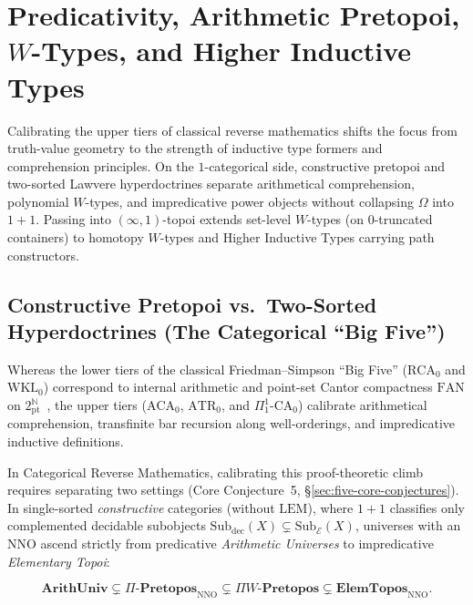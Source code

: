 \documentclass[10pt,twoside,openright]{book}
\theoremstyle{crmplain}
\theoremstyle{crmdef}
\theoremstyle{crmremark}
\begin{document}
\section{Predicativity, Arithmetic Pretopoi, $W$-Types, and Higher Inductive Types}\label{sec:predicativity-wtypes}

Calibrating the upper tiers of classical reverse mathematics shifts the focus from truth-value geometry to the strength of inductive type formers and comprehension principles. On the $1$-categorical side, constructive pretopoi and two-sorted Lawvere hyperdoctrines separate arithmetical comprehension, polynomial $W$-types, and impredicative power objects without collapsing $\Omega$ into $1 + 1$. Passing into $(\infty, 1)$-topoi extends set-level $W$-types (on $0$-truncated containers) to homotopy $W$-types and Higher Inductive Types carrying path constructors.

\subsection{Constructive Pretopoi vs.\ Two-Sorted Hyperdoctrines (The Categorical ``Big Five'')}

Whereas the lower tiers of the classical Friedman--Simpson ``Big Five'' ($\mathrm{RCA}_0$ and $\mathrm{WKL}_0$) correspond to internal arithmetic and point-set Cantor compactness $\mathrm{FAN}$ on $2^{\mathbb{N}}_{\mathrm{pt}}$~\cite{Simpson09}, the upper tiers ($\mathrm{ACA}_0$, $\mathrm{ATR}_0$, and $\Pi^1_1\text{-}\mathrm{CA}_0$) calibrate arithmetical comprehension, transfinite bar recursion along well-orderings, and impredicative inductive definitions.

In Categorical Reverse Mathematics, calibrating this proof-theoretic climb requires separating two settings (Core Conjecture~5, \S\ref{sec:five-core-conjectures}). In single-sorted \emph{constructive} categories (without $\mathrm{LEM}$), where $1 + 1$ classifies only complemented decidable subobjects $\mathrm{Sub}_{\mathrm{dec}}(X) \subsetneq \mathrm{Sub}_{\mathcal{E}}(X)$, universes with an $\mathrm{NNO}$ ascend strictly from predicative \emph{Arithmetic Universes} to impredicative \emph{Elementary Topoi}:

\[
  \mathbf{ArithUniv} \subsetneq \Pi\text{-}\mathbf{Pretopos}_{\mathrm{NNO}} \subsetneq \Pi W\text{-}\mathbf{Pretopos} \subsetneq \mathbf{ElemTopos}_{\mathrm{NNO}}.
\]
\end{document}
